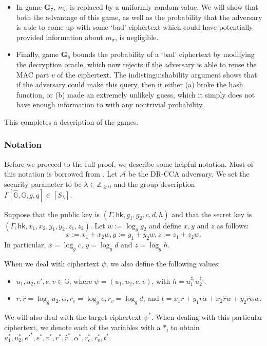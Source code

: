 \documentclass[10pt,a4paper]{article}
\newcommand{\adv}{\mathcal{A}}
\newcommand{\G}{\mathbb{G}}
\newcommand{\hk}{\mathsf{hk}}
\newcommand{\game}{\mathbf{G}}
\newcommand{\Z}{\mathbb{Z}}
\begin{document}
\begin{itemize}
		\item In game $\game_7$, $m_\sigma$ is replaced by a uniformly random value. We will show that both the advantage of this game, as well as the probability that the adversary is able to come up with some `bad' ciphertext which could have potentially provided information about $m_\sigma$, is negligible.
		\item Finally, game $\game_8$ bounds the probability of a `bad' ciphertext by modifying the decryption oracle, which now rejects if the adversary is able to reuse the MAC part $v$ of the ciphertext. The indistinguishability argument shows that if the adversary could make this query, then it either (a) broke the hash function, or (b) made an extremely unlikely guess, which it simply does not have enough information to with any nontrivial probability.
	\end{itemize}

	This completes a description of the games. 
	
	\subsubsection{Notation} Before we proceed to the full proof, we describe some helpful notation. Most of this notation is borrowed from \cite{cs01}. Let $\adv$ be the DR-CCA adversary. We set the security parameter to be $\lambda\in\Z_{\geq 0}$ and the group description $\Gamma[\hat{\G},\G,g,q]\in[S_\lambda]$.
	
	Suppose that the public key is $(\Gamma,\hk,g_1, g_2, c,d,h)$ and that the secret key is $(\Gamma,\hk,x_1,x_2,y_1,y_2,z_1,z_2)$. Let $w:=\log_{g}g_2$ and define $x,y$ and $z$ as follows: $$x:=x_1+x_2w, y:= y_1+y_2w, z:= z_1+z_2w.$$ In particular, $x=\log_{g}c$, $y=\log_gd$ and $z=\log_g h$.
	
	When we deal with ciphertext $\psi$, we also define the following values:
	\begin{itemize}
		\item $u_1,u_2,e',e,v\in\G$, where $\psi = (u_1,u_2,e,v)$, with $h = u_1^{z_1}u_2^{z_2}$.
		\item $r,\hat{r} = \log_gu_2, \alpha, r_e = \log_ge, r_v = \log_g d$, and $t = x_1r + y_1r\alpha + x_2\hat{r}w + y_2\hat{r}\alpha w$.
	\end{itemize}

	We will also deal with the target ciphertext $\psi^{*}$. When dealing with this particular ciphertext, we denote each of the variables with a $*$, to obtain $u_1^{*}, u_2^{*}, {e'}^{*}, e^{*}, v^{*}, r^{*},\hat{r}^{*}, \alpha^{*}, r_e^{*}, r_v^{*}, t^{*}.$
\end{document}
